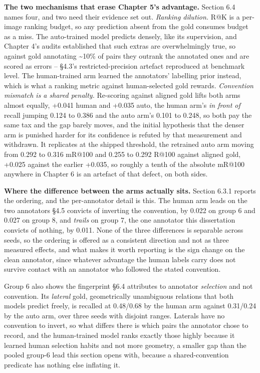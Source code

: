 \textbf{The two mechanisms that erase Chapter 5's advantage.} Section 6.4 names four, and two need their evidence set out. \textit{Ranking dilution.} R@K is a per-image ranking budget, so any prediction absent from the gold consumes budget as a miss. The auto-trained model predicts densely, like its supervision, and Chapter 4's audits established that such extras are overwhelmingly true, so against gold annotating \textasciitilde{}10\% of pairs they outrank the annotated ones and are scored as errors -- \S{}4.3's restricted-precision artefact reproduced at benchmark level. The human-trained arm learned the annotators' labelling prior instead, which is what a ranking metric against human-selected gold rewards. \textit{Convention mismatch is a shared penalty.} Re-scoring against aligned gold lifts both arms almost equally, +0.041 human and +0.035 auto, the human arm's \textit{in front of} recall jumping 0.124 to 0.386 and the auto arm's 0.101 to 0.248, so both pay the same tax and the gap barely moves, and the initial hypothesis that the denser arm is punished harder for its confidence is refuted by that measurement and withdrawn. It replicates at the shipped threshold, the retrained auto arm moving from 0.292 to 0.316 mR@100 and 0.255 to 0.292 R@100 against aligned gold, +0.025 against the earlier +0.035, so roughly a tenth of the absolute mR@100 anywhere in Chapter 6 is an artefact of that defect, on both sides.

\textbf{Where the difference between the arms actually sits.} Section 6.3.1 reports the ordering, and the per-annotator detail is this. The human arm leads on the two annotators \S{}4.5 convicts of inverting the convention, by 0.022 on group 6 and 0.027 on group 8, and \textit{trails} on group 7, the one annotator this dissertation convicts of nothing, by 0.011. None of the three differences is separable across seeds, so the ordering is offered as a consistent direction and not as three measured effects, and what makes it worth reporting is the sign change on the clean annotator, since whatever advantage the human labels carry does not survive contact with an annotator who followed the stated convention.

Group 6 also shows the fingerprint \S{}6.4 attributes to annotator \textit{selection} and not convention. Its \textit{lateral} gold, geometrically unambiguous relations that both models predict freely, is recalled at 0.48/0.68 by the human arm against 0.31/0.24 by the auto arm, over three seeds with disjoint ranges. Laterals have no convention to invert, so what differs there is which pairs the annotator chose to record, and the human-trained model ranks exactly those highly because it learned human selection habits and not more geometry, a smaller gap than the pooled group-6 lead this section opens with, because a shared-convention predicate has nothing else inflating it.

